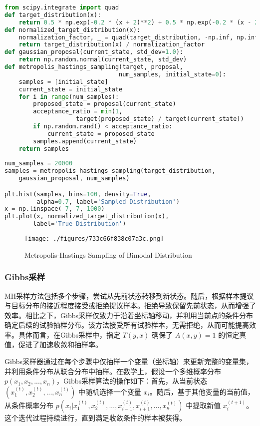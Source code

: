 \begin{lstlisting}[language=python]
from scipy.integrate import quad
def target_distribution(x):
    return 0.5 * np.exp(-0.2 * (x + 2)**2) + 0.5 * np.exp(-0.2 * (x - 2)**2)
def normalized_target_distribution(x):
    normalization_factor, _ = quad(target_distribution, -np.inf, np.inf)
    return target_distribution(x) / normalization_factor
def gaussian_proposal(current_state, std_dev=1.0):
    return np.random.normal(current_state, std_dev)
def metropolis_hastings_sampling(target, proposal, 
                                num_samples, initial_state=0):
    samples = [initial_state]
    current_state = initial_state
    for i in range(num_samples):
        proposed_state = proposal(current_state)
        acceptance_ratio = min(1, 
                    target(proposed_state) / target(current_state))
        if np.random.rand() < acceptance_ratio:
            current_state = proposed_state
        samples.append(current_state)
    return samples
    
num_samples = 20000
samples = metropolis_hastings_sampling(target_distribution, 
    gaussian_proposal, num_samples)

plt.hist(samples, bins=100, density=True,
         alpha=0.7, label='Sampled Distribution')
x = np.linspace(-7, 7, 1000)
plt.plot(x, normalized_target_distribution(x),
        label='True Distribution')
\end{lstlisting}

\begin{figure}[ht]
\centering
\texttt{[image: ./figures/733c66f838c07a3c.png]}
\caption{Metropolis-Hastings Sampling of Bimodal Distribution} \label{fig_MCMC_1}
\end{figure}

\subsubsection{Gibbs采样}

MH采样方法包括多个步骤，尝试从先前状态转移到新状态。随后，根据样本提议与目标分布的接近程度接受或拒绝提议样本。拒绝导致保留先前状态，从而增强了效率。相比之下，Gibbs采样仅致力于沿着坐标轴移动，并利用当前点的条件分布确定后续的试验抽样分布。该方法接受所有试验样本，无需拒绝，从而可能提高效率。具体而言，在Gibbs采样中，指定 $T(y, x)$ 确保了 $A(x,y) = 1$ 的恒定真值，促进了加速收敛和抽样率。

Gibbs采样器通过在每个步骤中仅抽样一个变量（坐标轴）来更新完整的变量集，并利用条件分布从联合分布中抽样。在数学上，假设一个多维概率分布 $p(x_1, x_2, ..., x_n)$，Gibbs采样算法的操作如下：首先，从当前状态 $(x_1^{(t)}, x_2^{(t)}, ..., x_n^{(t)})$ 中随机选择一个变量 $x_i$。随后，基于其他变量的当前值，从条件概率分布 $p(x_i | x_1^{(t)}, x_2^{(t)}, ..., x_{i-1}^{(t)}, x_{i+1}^{( t)}, ..., x_n^{(t)})$ 中提取新值 $x_i^{(t+1)}$。这个迭代过程持续进行，直到满足收敛条件的样本被获得。

